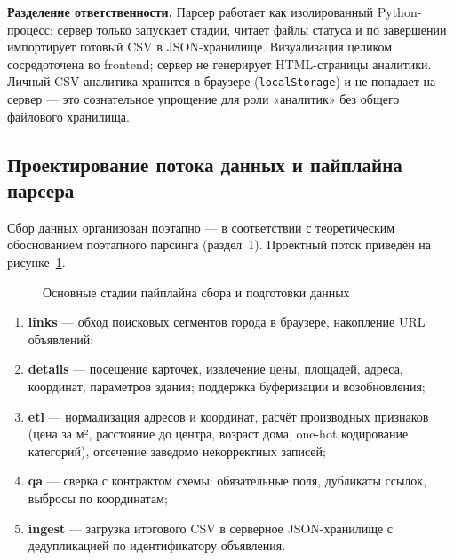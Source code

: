 \textbf{Разделение ответственности.} Парсер работает как изолированный Python-процесс: сервер только запускает стадии, читает файлы статуса и по завершении импортирует готовый CSV в JSON-хранилище. Визуализация целиком сосредоточена во frontend; сервер не генерирует HTML-страницы аналитики. Личный CSV аналитика хранится в браузере (\texttt{localStorage}) и не попадает на сервер --- это сознательное упрощение для роли «аналитик» без общего файлового хранилища.

\subsection{Проектирование потока данных и пайплайна парсера}

Сбор данных организован поэтапно --- в соответствии с теоретическим обоснованием поэтапного парсинга (раздел~1). Проектный поток приведён на рисунке~\ref{fig:parser-flow}.

\begin{figure}[htbp]
\centering
{}
\caption{Основные стадии пайплайна сбора и подготовки данных}
\label{fig:parser-flow}
\end{figure}

\begin{enumerate}
    \item \textbf{links} --- обход поисковых сегментов города в браузере, накопление URL объявлений;
    \item \textbf{details} --- посещение карточек, извлечение цены, площадей, адреса, координат, параметров здания; поддержка буферизации и возобновления;
    \item \textbf{etl} --- нормализация адресов и координат, расчёт производных признаков (цена за м², расстояние до центра, возраст дома, one-hot кодирование категорий), отсечение заведомо некорректных записей;
    \item \textbf{qa} --- сверка с контрактом схемы: обязательные поля, дубликаты ссылок, выбросы по координатам;
    \item \textbf{ingest} --- загрузка итогового CSV в серверное JSON-хранилище с дедупликацией по идентификатору объявления.
\end{enumerate}

